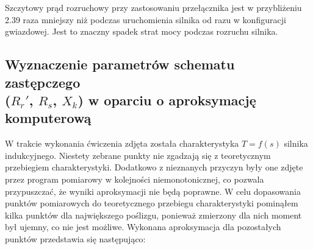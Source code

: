 \documentclass[12pt]{article}
\begin{document}
Szczytowy prąd rozruchowy przy zastosowaniu przełącznika jest w przybliżeniu
2.39 raza mniejszy niż podczas uruchomienia silnika od razu w konfiguracji
gwiazdowej. Jest to znaczny spadek strat mocy podczas rozruchu silnika.

\newpage

\subsection{Wyznaczenie parametrów schematu zastępczego \\ ($R_r'$, $R_s$,
$X_k$) w oparciu o aproksymację komputerową}

W trakcie wykonania ćwiczenia zdjęta została charakterystyka $T=f(s)$ silnika
indukcyjnego. Niestety zebrane punkty nie zgadzają się z teoretycznym
przebiegiem charakterystyki. Dodatkowo z nieznanych przyczyn były one zdjęte
przez program pomiarowy w kolejności niemonotonicznej, co pozwala przypuszczać,
że wyniki aproksymacji nie będą poprawne. W celu dopasowania punktów pomiarowych
do teoretycznego przebiegu charakterystyki pominąłem kilka punktów dla
największego poślizgu, ponieważ zmierzony dla nich moment był ujemny, co nie
jest możliwe. Wykonana aproksymacja dla pozostałych punktów przedstawia się
następująco:
\end{document}
